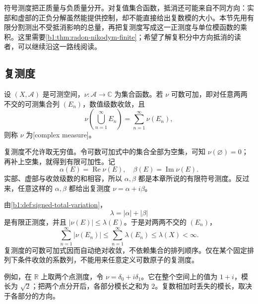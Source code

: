 

符号测度把正质量与负质量分开。对复值集合函数，抵消还可能来自不同方向：实部和虚部的正负分解虽然能提供控制，却不能直接给出复数模的大小。本节先用有限分割测出不受抵消影响的总量，再把复测度写成这一正测度与单位模函数的乘积。这里需要\cref{b1:thm:radon-nikodym-finite}；希望了解复积分中方向抵消的读者，可以继续沿这一路线阅读。

\subsection{复测度}
\label{b1:subsec:060501}

\begin{definition}\label{b1:def:complex-measure}
设 \((X,\mathcal A)\) 是可测空间，\(\nu:\mathcal A\rightarrow\mathbb C\) 为集合函数。若 \(\nu\) 可数可加，即对任意两两不交的可测集合列 \((E_n)\)，数值级数收敛，且
\[
\nu\left(\bigcup_{n=1}^{\infty}E_n\right)
=\sum_{n=1}^{\infty}\nu(E_n),
\]
则称 \(\nu\) 为[complex measure]。
\end{definition}

复测度不允许取无穷值。令可数可加式中的集合全部为空集，可知 \(\nu(\varnothing)=0\)；再补上空集，就得到有限可加性。记
\[
\alpha(E)=\operatorname{Re}\nu(E),\quad
\beta(E)=\operatorname{Im}\nu(E).
\]
实部、虚部与收敛级数的和相容，所以 \(\alpha,\beta\) 都是本章所说的有限符号测度。反过来，任意这样的 \(\alpha,\beta\) 都给出复测度 \(\nu=\alpha+i\beta\)。

\ProseParagraphBreak

由\cref{b1:def:signed-total-variation}，
\[
\lambda=|\alpha|+|\beta|
\]
是有限正测度，并且 \(|\nu(E)|\leq\lambda(E)\)。于是对两两不交的 \((E_n)\)，
\[
\sum_{n=1}^{\infty}|\nu(E_n)|
\leq\sum_{n=1}^{\infty}\lambda(E_n)
\leq\lambda(X)<\infty.
\]
复测度的可数可加式因而自动绝对收敛，不依赖集合的排列顺序。仅在某个固定排列下条件收敛的系数列，不能用来任意定义可数原子的复测度。

\ProseParagraphBreak

例如，在 \(\mathbb R\) 上取两个点测度，令 \(\nu=\delta_0+i\delta_1\)。它在整个空间上的值为 \(1+i\)，模长为 \(\sqrt2\)；把两个点分开后，各部分模长之和为 \(2\)。复数相加时丢失的模长，取决于各部分的方向。

